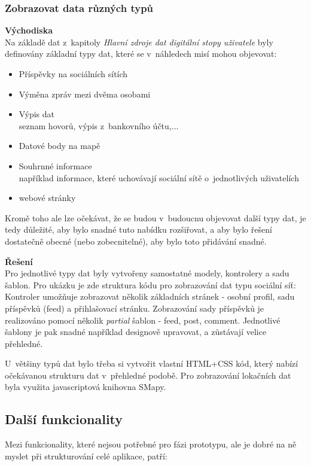 \subsubsection*{Zobrazovat data různých typů}
	\textbf{Východiska}\\
	Na základě dat z~kapitoly \textit{Hlavní zdroje dat digitální stopy uživatele} byly definovány základní typy dat, které se v~náhledech misí mohou objevovat:

	\begin{itemize}
		\item Příspěvky na sociálních sítích
		\item Výměna zpráv mezi dvěma osobami
		\item Výpis dat\\
			seznam hovorů, výpis z~bankovního účtu,...
		\item Datové body na mapě
		\item Souhrnné informace\\
			například informace, které uchovávají sociální sítě o~jednotlivých uživatelích
		\item webové stránky
	\end{itemize}

	Kromě toho ale lze očekávat, že se budou v~budoucnu objevovat další typy dat, je tedy důležité, aby bylo snadné tuto nabídku rozšiřovat, a aby bylo řešení dostatečně obecné (nebo zobecnitelné), aby bylo toto přidávání snadné. 

	\textbf{Řešení}\\
	Pro jednotlivé typy dat byly vytvořeny samostatné modely, kontrolery a sadu šablon. Pro ukázku je zde struktura kódu pro zobrazování dat typu sociální síť:\\
	Kontroler umožňuje zobrazovat několik základních stránek - osobní profil, sadu příspěvků (feed) a přihlašovací stránku.
	Zobrazování sady příspěvků je realizováno pomocí několik \textit{partial} šablon - feed, post, comment. Jednotlivé šablony je pak snadné například designově upravovat, a zůstávají velice přehledné.

	U~většiny typů dat bylo třeba si vytvořit vlastní HTML+CSS kód, který nabízí očekávanou strukturu dat v~přehledné podobě.
	Pro zobrazování lokačních dat byla využita javascriptová knihovna SMapy.   


\subsection{Další funkcionality}
Mezi funkcionality, které nejsou potřebné pro fázi prototypu, ale je dobré na ně myslet při strukturování celé aplikace, patří:

